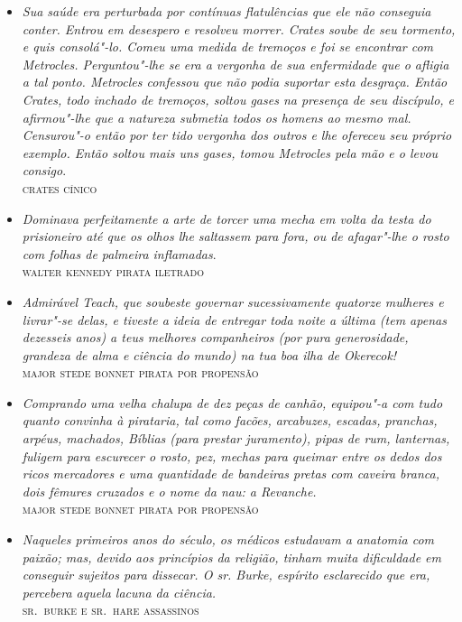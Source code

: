 \documentclass[12pt]{extarticle}
\begin{document}
\begin{itemize}
\item\emph{Sua saúde era perturbada por contínuas flatulências que ele não
conseguia conter. Entrou em desespero e resolveu morrer. Crates soube de
seu tormento, e quis consolá"-lo. Comeu uma medida de tremoços e foi se
encontrar com Metrocles. Perguntou"-lhe se era a vergonha de sua
enfermidade que o afligia a tal ponto. Metrocles confessou que não podia
suportar esta desgraça. Então Crates, todo inchado de tremoços, soltou
gases na presença de seu discípulo, e afirmou"-lhe que a natureza
submetia todos os homens ao mesmo mal. Censurou"-o então por ter tido
vergonha dos outros e lhe ofereceu seu próprio exemplo. Então soltou
mais uns gases, tomou Metrocles pela mão e o levou consigo}.\\
\textsc{crates cínico}

\item\emph{Dominava perfeitamente a arte de torcer uma mecha em volta da
testa do prisioneiro até que os olhos lhe saltassem para fora, ou de
afagar"-lhe o rosto com folhas de palmeira inflamadas}.\\
\textsc{walter kennedy pirata iletrado}

\item\emph{Admirável Teach, que soubeste governar sucessivamente quatorze
mulheres e livrar"-se delas, e tiveste a ideia de entregar toda noite a
última (tem apenas dezesseis anos) a teus melhores companheiros (por
pura generosidade, grandeza de alma e ciência do mundo) na tua boa ilha
de Okerecok!}\\
\textsc{major stede bonnet pirata por propensão}

\item\emph{Comprando uma velha chalupa de dez peças de canhão, equipou"-a
com tudo quanto convinha à pirataria, tal como facões, arcabuzes,
escadas, pranchas, arpéus, machados, Bíblias (para prestar juramento),
pipas de rum, lanternas, fuligem para escurecer o rosto, pez, mechas
para queimar entre os dedos dos ricos mercadores e uma quantidade de
bandeiras pretas com caveira branca, dois fêmures cruzados e o nome da
nau: a Revanche.}\\
\textsc{major stede bonnet pirata por propensão}

\item\emph{Naqueles primeiros anos do século, os médicos estudavam a
anatomia com paixão; mas, devido aos princípios da religião, tinham
muita dificuldade em conseguir sujeitos para dissecar. O sr. Burke,
espírito esclarecido que era, percebera aquela lacuna da ciência.}\\
\textsc{sr.~burke e sr.~hare assassinos}
\end{itemize}
\end{document}
